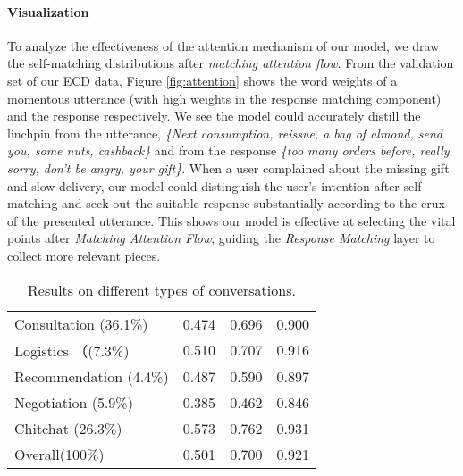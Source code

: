 \documentclass[11pt]{article}
\begin{document}
\paragraph{Visualization}
To analyze the effectiveness of the attention mechanism of our model, we draw the self-matching distributions after \emph{matching attention flow}. From the validation set of our ECD data, Figure \ref{fig:attention} shows the word weights of a momentous utterance (with high weights in the response matching component) and the response respectively. We see the model could accurately distill the linchpin from the utterance, \emph{\{Next consumption, reissue, a bag of almond, send you, some nuts, cashback\}} and from the response \emph{\{too many orders before, really sorry, don't be angry, your gift\}}. When a user complained about the missing gift and slow delivery, our model could distinguish the user's intention after self-matching and seek out the suitable response substantially according to the crux of the presented utterance. This shows our model is effective at selecting the vital points after \emph{Matching Attention Flow}, guiding the \emph{Response Matching} layer to collect more relevant pieces. 


\begin{table}[t]
	\centering
	{
		\begin{tabular}{l|l|l|l}
			\hline
			
			\hline
			&  &  &   \\
			\hline
			Consultation (36.1\%) & 0.474 & 0.696  & 0.900 \\
			Logistics （(7.3\%) & 0.510 & 0.707 & 0.916   \\
			Recommendation (4.4\%) & 0.487 & 0.590 & 0.897    \\
			Negotiation (5.9\%) & 0.385 & 0.462 & 0.846    \\
			Chitchat (26.3\%) & 0.573 & 0.762 & 0.931 \\
			\hline
			Overall(100\%) & 0.501 & 0.700 & 0.921 \\
			\hline
			
			\hline
		\end{tabular}
		
	}
	\caption{\label{tab:type_ECD} Results on different types of conversations.}
\end{table}
\end{document}
